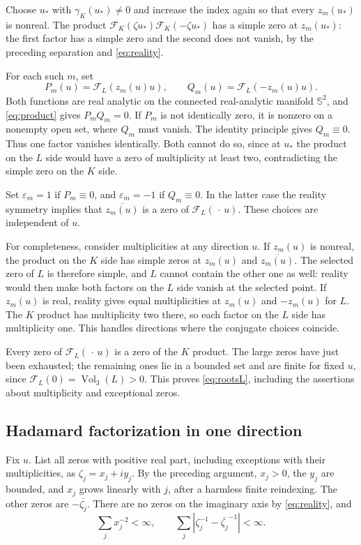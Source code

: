 \documentclass[11pt,a4paper]{article}
\theoremstyle{definition}
\theoremstyle{remark}
\newcommand{\Sph}{\mathbb S^2}
\newcommand{\vol}{\operatorname{Vol}_3}
\newcommand{\F}{\mathcal F}
\numberwithin{equation}{section}
\begin{document}
Choose $u_*$ with $\gamma_K(u_*)\ne0$ and increase the index again so
that every $z_m(u_*)$ is nonreal. The product
$\F_K(\zeta u_*)\F_K(-\zeta u_*)$ has a simple zero at $z_m(u_*)$:
the first factor has a simple zero and the second does not vanish,
by the preceding separation and \eqref{eq:reality}.

For each such $m$, set
\[
 P_m(u)=\F_L(z_m(u)u),\qquad Q_m(u)=\F_L(-z_m(u)u).
\]
Both functions are real analytic on the connected real-analytic manifold
$\Sph$, and \eqref{eq:product} gives $P_mQ_m=0$.
If $P_m$ is not identically zero, it is nonzero on a nonempty open set,
where $Q_m$ must vanish. The identity principle gives $Q_m\equiv0$.
Thus one factor vanishes identically. Both cannot do so, since at $u_*$
the product on the $L$ side would have a zero of multiplicity at least
two, contradicting the simple zero on the $K$ side.

Set $\varepsilon_m=1$ if $P_m\equiv0$, and $\varepsilon_m=-1$ if
$Q_m\equiv0$. In the latter case the reality symmetry implies that
$\overline{z_m(u)}$ is a zero of $\F_L(\,\cdot\,u)$.
These choices are independent of $u$.

For completeness, consider multiplicities at any direction $u$.
If $z_m(u)$ is nonreal, the product on the $K$ side has simple zeros
at $z_m(u)$ and $\overline{z_m(u)}$. The selected zero of $L$ is
therefore simple, and $L$ cannot contain the other one as well:
reality would then make both factors on the $L$ side vanish at the
selected point. If $z_m(u)$ is real, reality gives equal multiplicities
at $z_m(u)$ and $-z_m(u)$ for $L$. The $K$ product has multiplicity
two there, so each factor on the $L$ side has multiplicity one.
This handles directions where the conjugate choices coincide.

Every zero of $\F_L(\,\cdot\,u)$ is a zero of the $K$ product.
The large zeros have just been exhausted; the remaining ones lie in a
bounded set and are finite for fixed $u$, since $\F_L(0)=\vol(L)>0$.
This proves \eqref{eq:rootsL}, including the assertions about multiplicity
and exceptional zeros.

\subsection{Hadamard factorization in one direction}\label{app:hadamard}
Fix $u$. List all zeros with positive real part, including exceptions
with their multiplicities, as $\zeta_j=x_j+iy_j$. By the preceding
argument, $x_j>0$, the $y_j$ are bounded, and $x_j$ grows linearly
with $j$, after a harmless finite reindexing. The other zeros are
$-\overline{\zeta_j}$. There are no zeros on the imaginary axis by
\eqref{eq:reality}, and
\begin{equation}\label{eq:inverse-sums}
 \sum_j x_j^{-2}<\infty,\qquad
 \sum_j\left|\zeta_j^{-1}-\overline{\zeta_j}^{-1}\right|<\infty .
\end{equation}
\end{document}
